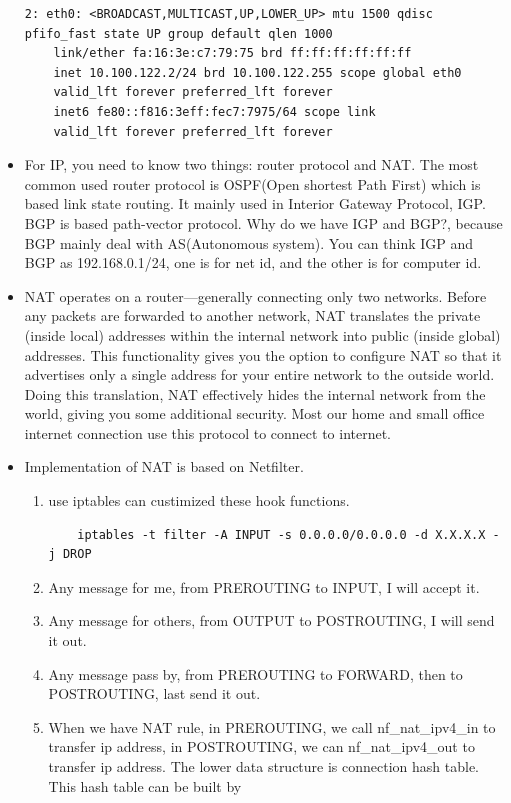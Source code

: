 \documentclass[a4paper,11pt,twoside]{book}
\begin{document}
\begin{itemize}
\begin{lstlisting}
2: eth0: <BROADCAST,MULTICAST,UP,LOWER_UP> mtu 1500 qdisc pfifo_fast state UP group default qlen 1000
	link/ether fa:16:3e:c7:79:75 brd ff:ff:ff:ff:ff:ff
	inet 10.100.122.2/24 brd 10.100.122.255 scope global eth0
	valid_lft forever preferred_lft forever
	inet6 fe80::f816:3eff:fec7:7975/64 scope link
	valid_lft forever preferred_lft forever
\end{lstlisting}


	\item  For IP, you need to know two things: router protocol and NAT. The most common used router protocol is OSPF(Open shortest Path First) which is based link state routing.  It mainly used in Interior Gateway Protocol, IGP.  BGP is based path-vector protocol. Why do we have IGP and BGP?, because BGP mainly deal with AS(Autonomous system). You can think IGP and BGP as 192.168.0.1/24, one is for net id, and the other is for computer id. 
	
	\item NAT operates on a router—generally connecting only two networks. Before any packets are forwarded to another network, NAT translates the private (inside local) addresses within the internal network into public (inside global) addresses. This functionality gives you the option to configure NAT so that it advertises only a single address for your entire network to the outside world. Doing this translation, NAT effectively hides the internal network from the world, giving you some additional security. Most our home and small office internet connection use this protocol to connect to internet. 
	
	\item Implementation of NAT is based on Netfilter. 
	\begin{enumerate}
		\item use iptables can custimized these hook functions. 
\begin{lstlisting}
	iptables -t filter -A INPUT -s 0.0.0.0/0.0.0.0 -d X.X.X.X -j DROP
\end{lstlisting}				
		\item Any message for me, from PREROUTING to INPUT, I will accept it.
		\item Any message for others, from OUTPUT to POSTROUTING, I will send it out.
		\item Any message pass by, from PREROUTING to FORWARD, then to POSTROUTING, last send it out. 
	
		\item When we have NAT rule, in PREROUTING, we call nf\_nat\_ipv4\_in to transfer ip address, in POSTROUTING, we can nf\_nat\_ipv4\_out to transfer ip address. The lower data structure is connection hash table. This hash table can be built by 
		

\end{enumerate}
\end{itemize}
\end{document}
